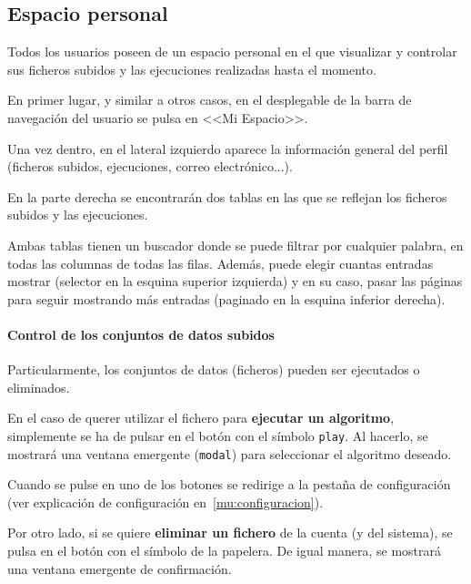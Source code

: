 \label{mu:perfil}

\subsection{Espacio personal}

Todos los usuarios poseen de un espacio personal en el que visualizar y
controlar sus ficheros subidos y las ejecuciones realizadas hasta el momento.

En primer lugar, y similar a otros casos, en el desplegable de la barra de
navegación del usuario se pulsa en <<Mi Espacio>>.


Una vez dentro, en el lateral izquierdo aparece la información general del
perfil (ficheros subidos, ejecuciones, correo electrónico...).

En la parte derecha se encontrarán dos tablas en las que se reflejan los
ficheros subidos y las ejecuciones.


Ambas tablas tienen un buscador donde se puede filtrar por cualquier palabra, en
todas las columnas de todas las filas. Además, puede elegir cuantas entradas
mostrar (selector en la esquina superior izquierda) y en su caso, pasar las
páginas para seguir mostrando más entradas (paginado en la esquina inferior
derecha).

\paragraph{Control de los conjuntos de datos subidos} Particularmente, los
conjuntos de datos (ficheros) pueden ser ejecutados o eliminados.

En el caso de querer utilizar el fichero para \textbf{ejecutar un algoritmo},
simplemente se ha de pulsar en el botón con el símbolo \texttt{play}. Al
hacerlo, se mostrará una ventana emergente (\texttt{modal}) para seleccionar el
algoritmo deseado.


Cuando se pulse en uno de los botones se redirige a la pestaña de configuración
(ver explicación de configuración en~\ref{mu:configuracion}).

\label{mu:eliminardataset}
Por otro lado, si se quiere \textbf{eliminar un fichero} de la cuenta (y del
sistema), se pulsa en el botón con el símbolo de la papelera. De igual manera,
se mostrará una ventana emergente de confirmación.

